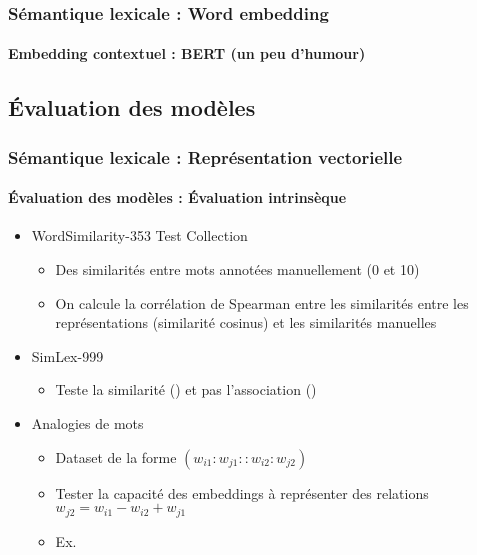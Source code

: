 \documentclass[xcolor=table]{beamer}
\begin{document}
\begin{frame}
\frametitle{Sémantique lexicale : Word embedding}
\framesubtitle{Embedding contextuel : BERT (un peu d'humour)}
	\vspace{-3pt}
	\begin{center}
	\end{center}
	
\end{frame}


\subsection{Évaluation des modèles}

\begin{frame}
\frametitle{Sémantique lexicale : Représentation vectorielle}
\framesubtitle{Évaluation des modèles : Évaluation intrinsèque}

\begin{itemize}
	\item  WordSimilarity-353 Test Collection \cite{2002-finkelstein-al}
	\begin{itemize}
		\item Des similarités entre mots annotées manuellement (0 et 10)
		\item On calcule la corrélation de Spearman entre les similarités entre les représentations (similarité cosinus) et les similarités manuelles
	\end{itemize}
	
	\item SimLex-999 \cite{2015-hill-al}
	\begin{itemize}
		\item Teste la similarité () et pas l'association ()
	\end{itemize}

	\item Analogies de mots \cite{2013-mikolov-al2}
	\begin{itemize}
		\item Dataset de la forme $(w_{i1}:w_{j1} :: w_{i2}:w_{j2})$
		\item Tester la capacité des embeddings à représenter des relations $w_{j2} = w_{i1} - w_{i2} + w_{j1}$
		\item Ex. 
	\end{itemize}

\end{itemize}
	
\end{frame}
\end{document}
